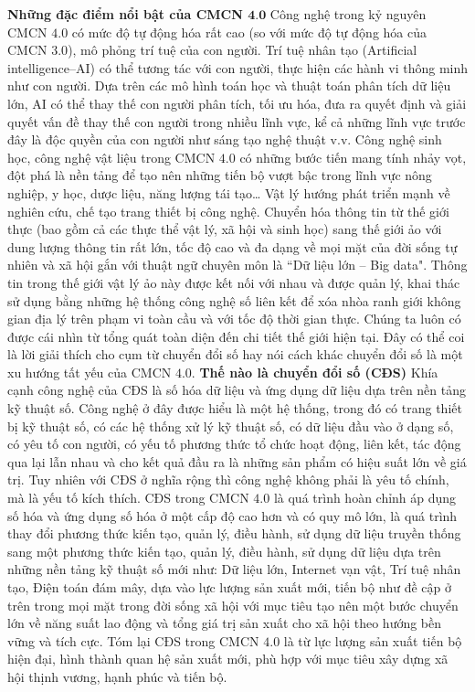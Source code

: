\begin{multicols}{2}
	\textbf{\color{toanhocdoisong}Những đặc điểm nổi bật của CMCN $\pmb{4{.}0}$}
	\vskip 0.1cm
	Công nghệ trong kỷ nguyên CMCN $4{.}0$ có mức độ tự động hóa rất cao (so với mức độ tự động hóa của CMCN $3.0$), mô phỏng trí tuệ của con người. Trí tuệ nhân tạo (Artificial intelligence--AI) có thể tương tác với con người, thực hiện các hành vi thông minh như con người. Dựa trên các mô hình toán học và thuật toán phân tích dữ liệu lớn, AI có thể thay thế con người phân tích, tối ưu hóa, đưa ra quyết định và giải quyết vấn đề thay thế con người trong nhiều lĩnh vực, kể cả những lĩnh vực trước đây là độc quyền của con người như sáng tạo nghệ thuật v.v. 
	\vskip 0.1cm
	Công nghệ sinh học, công nghệ vật liệu trong CMCN $4.0$ có những bước tiến mang tính nhảy vọt, đột phá là nền tảng để tạo nên những tiến bộ vượt bậc trong lĩnh vực nông nghiệp, y học, dược liệu, năng lượng tái tạo… Vật lý hướng phát triển mạnh về nghiên cứu, chế tạo trang thiết bị công nghệ.
	\vskip 0.1cm
	Chuyển hóa thông tin từ thế giới thực (bao gồm cả các thực thể vật lý, xã hội và sinh học) sang thế giới ảo với dung lượng thông tin rất lớn, tốc độ cao và đa dạng về mọi mặt của đời sống tự nhiên và xã hội gắn với thuật ngữ chuyên môn là ``Dữ liệu lớn -- Big data". 
	\vskip 0.1cm
	Thông tin trong thế giới vật lý ảo này được kết nối với nhau và được quản lý, khai thác sử dụng bằng những hệ thống công nghệ số liên kết để xóa nhòa ranh giới không gian địa lý trên phạm vi toàn cầu và với tốc độ thời gian thực. Chúng ta luôn có được cái nhìn từ tổng quát toàn diện đến chi tiết thế giới hiện tại. Đây có thể coi là lời giải thích cho cụm từ chuyển đổi số hay nói cách khác chuyển đổi số là một xu hướng tất yếu của CMCN $4{.}0$.
	\vskip 0.1cm
	\textbf{\color{toanhocdoisong}Thế nào là chuyển đổi số (CĐS)}
	\vskip 0.1cm
	Khía cạnh công nghệ của CĐS là số hóa dữ liệu và ứng dụng dữ liệu dựa trên nền tảng kỹ thuật số. Công nghệ ở đây được hiểu là một hệ thống, trong đó có trang thiết bị kỹ thuật số, có các hệ thống xử lý kỹ thuật số, có dữ liệu đầu vào ở dạng số, có yêu tố con người, có yếu tố phương thức tổ chức hoạt động,  liên kết, tác động qua lại lẫn nhau và cho kết quả đầu ra là những sản phẩm có hiệu suất lớn về giá trị.
	\vskip 0.1cm
	Tuy nhiên với CĐS ở nghĩa rộng thì công nghệ không phải là yêu tố chính, mà là yếu tố kích thích. CĐS trong CMCN $4{.}0$ là quá trình hoàn chỉnh áp dụng số hóa và ứng dụng số hóa ở một cấp độ cao hơn và có quy mô lớn, là quá trình thay đổi phương thức kiến tạo, quản lý, điều hành, sử dụng dữ liệu truyền thống sang một phương thức kiến tạo, quản lý, điều hành, sử dụng dữ liệu dựa trên những nền tảng kỹ thuật số mới như: Dữ liệu lớn, Internet vạn vật, Trí tuệ nhân tạo, Điện toán đám mây, dựa vào lực lượng sản xuất mới, tiến bộ như đề cập ở trên trong mọi mặt trong đời sống xã hội với mục tiêu tạo nên một bước chuyển lớn về năng suất lao động và tổng giá trị sản xuất cho xã hội theo hướng bền vững và tích cực. Tóm lại CĐS trong CMCN $4{.}0$ là từ lực lượng sản xuất tiến bộ hiện đại, hình thành quan hệ sản xuất mới, phù hợp với mục tiêu xây dựng xã hội thịnh vương, hạnh phúc và tiến bộ. 

\end{multicols}
